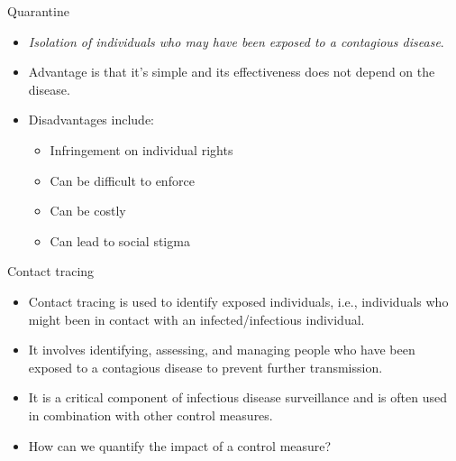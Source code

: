 \documentclass[
  ignorenonframetext,
]{beamer}
\providecommand{\tightlist}{%
  \setlength{\itemsep}{0pt}\setlength{\parskip}{0pt}}\usepackage{longtable,booktabs,array}
\begin{document}
\begin{frame}
\begin{block}{Quarantine}
\label{quarantine}
\begin{itemize}
\tightlist
\item
  \emph{Isolation of individuals who may have been exposed to a
  contagious disease}.
\item
  Advantage is that it's simple and its effectiveness does not depend on
  the disease.
\item
  Disadvantages include:

  \begin{itemize}
  \tightlist
  \item
    Infringement on individual rights
  \item
    Can be difficult to enforce
  \item
    Can be costly
  \item
    Can lead to social stigma
  \end{itemize}
\end{itemize}
\end{block}
\end{frame}

\begin{frame}
\begin{block}{Contact tracing}
\label{contact-tracing}
\begin{itemize}
\tightlist
\item
  Contact tracing is used to identify exposed individuals, i.e.,
  individuals who might been in contact with an infected/infectious
  individual.
\item
  It involves identifying, assessing, and managing people who have been
  exposed to a contagious disease to prevent further transmission.
\item
  It is a critical component of infectious disease surveillance and is
  often used in combination with other control measures.
\end{itemize}
\end{block}
\end{frame}

\begin{frame}
\begin{tcolorbox}[enhanced jigsaw, colframe=quarto-callout-caution-color-frame, toprule=.15mm, opacitybacktitle=0.6, breakable, colback=white, leftrule=.75mm, left=2mm, opacityback=0, titlerule=0mm, bottomtitle=1mm, toptitle=1mm, title={Discussion}, bottomrule=.15mm, arc=.35mm, coltitle=black, colbacktitle=quarto-callout-caution-color!10!white, rightrule=.15mm]

\begin{itemize}
\tightlist
\item
  How can we quantify the impact of a control measure?
\end{itemize}

\end{tcolorbox}
\end{frame}
\end{document}

